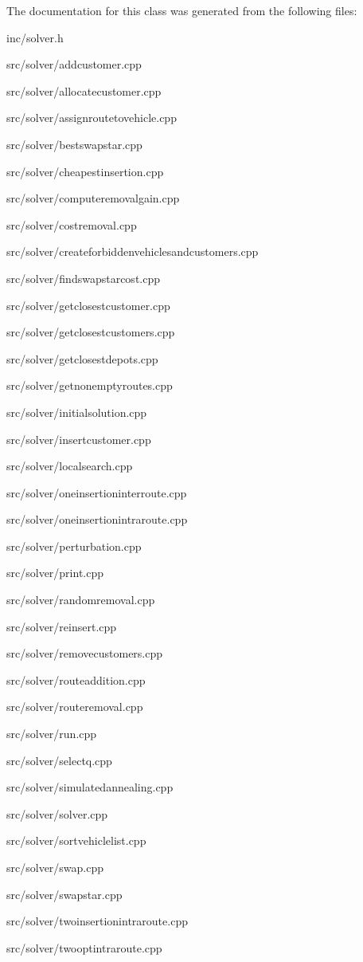 The documentation for this class was generated from the following files\+:\begin{DoxyCompactItemize}
\item 
inc/solver.\+h\item 
src/solver/addcustomer.\+cpp\item 
src/solver/allocatecustomer.\+cpp\item 
src/solver/assignroutetovehicle.\+cpp\item 
src/solver/bestswapstar.\+cpp\item 
src/solver/cheapestinsertion.\+cpp\item 
src/solver/computeremovalgain.\+cpp\item 
src/solver/costremoval.\+cpp\item 
src/solver/createforbiddenvehiclesandcustomers.\+cpp\item 
src/solver/findswapstarcost.\+cpp\item 
src/solver/getclosestcustomer.\+cpp\item 
src/solver/getclosestcustomers.\+cpp\item 
src/solver/getclosestdepots.\+cpp\item 
src/solver/getnonemptyroutes.\+cpp\item 
src/solver/initialsolution.\+cpp\item 
src/solver/insertcustomer.\+cpp\item 
src/solver/localsearch.\+cpp\item 
src/solver/oneinsertioninterroute.\+cpp\item 
src/solver/oneinsertionintraroute.\+cpp\item 
src/solver/perturbation.\+cpp\item 
src/solver/print.\+cpp\item 
src/solver/randomremoval.\+cpp\item 
src/solver/reinsert.\+cpp\item 
src/solver/removecustomers.\+cpp\item 
src/solver/routeaddition.\+cpp\item 
src/solver/routeremoval.\+cpp\item 
src/solver/run.\+cpp\item 
src/solver/selectq.\+cpp\item 
src/solver/simulatedannealing.\+cpp\item 
src/solver/solver.\+cpp\item 
src/solver/sortvehiclelist.\+cpp\item 
src/solver/swap.\+cpp\item 
src/solver/swapstar.\+cpp\item 
src/solver/twoinsertionintraroute.\+cpp\item 
src/solver/twooptintraroute.\+cpp\end{DoxyCompactItemize}
